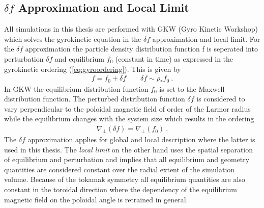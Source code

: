 \subsection{$\delta f$ Approximation and Local Limit}
\label{sub:application}

All simulations in this thesis are performed with GKW (Gyro Kinetic Workshop) which solves the gyrokinetic equation in the $\delta f$ approximation and local limit. For the $\delta f$ approximation the particle density distribution function f is seperated into perturbation $\delta f$ and equilibrium $f_0$ (constant in time) as expressed in the gyrokinetic ordering (\ref{eq:gyroordering}). This is given by
\begin{gather}
	f = f_0 + \delta f \qquad \delta f \sim \rho_* f_0~.
\end{gather}
In GKW the equilibrium distribution function $f_0$ is set to the Maxwell distribution function. The perturbed distribution function $\delta f$ is considered to vary perpendicular to the poloidal magnetic field of order of the Larmor radius while the equilibrium changes with the system size which results in the ordering
\begin{gather}
	\nabla_\perp(\delta f) = \nabla_\perp (f_0)~.
\end{gather}
The $\delta f$ approximation applies for global and local description where the latter is used in this thesis.
The \textit{local limit} on the other hand uses the spatial separation of equilibrium and perturbation and implies that all equilibrium and geometry quantities are considered constant over the radial extent of the simulation volume. Because of the tokamak symmetry all equilibrium quantities are also constant in the toroidal direction where the dependency of the equilibrium magnetic field on the poloidal angle is retrained in general. \\\bigskip

